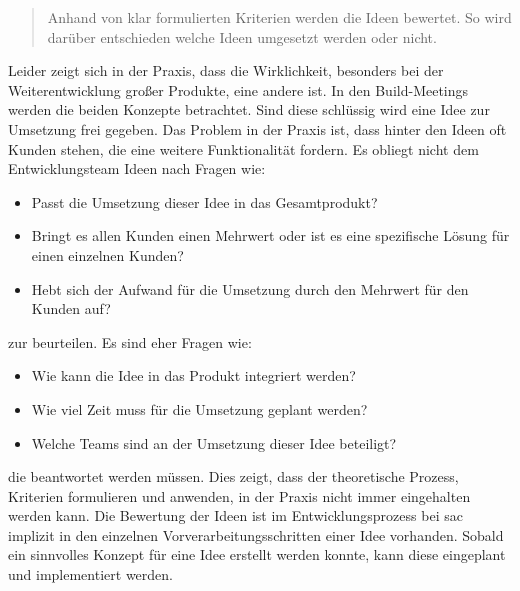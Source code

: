 \begin{quote}Anhand von klar formulierten Kriterien werden die Ideen bewertet. So wird darüber entschieden welche Ideen umgesetzt werden oder nicht.\end{quote}

Leider zeigt sich in der Praxis, dass die Wirklichkeit, besonders bei der Weiterentwicklung großer Produkte, eine andere ist. 
In den Build-Meetings werden die beiden Konzepte betrachtet. Sind diese schlüssig wird eine Idee zur Umsetzung frei gegeben. 
Das Problem in der Praxis ist, dass hinter den Ideen oft Kunden stehen, die eine weitere Funktionalität fordern. Es obliegt nicht 
dem Entwicklungsteam Ideen nach Fragen wie: 
\begin{itemize}
    \item Passt die Umsetzung dieser Idee in das Gesamtprodukt?
    \item Bringt es allen Kunden einen Mehrwert oder ist es eine spezifische Lösung für einen einzelnen Kunden?
    \item Hebt sich der Aufwand für die Umsetzung durch den Mehrwert für den Kunden auf?
\end{itemize}
zur beurteilen. Es sind eher Fragen wie: 
\begin{itemize}
    \item Wie kann die Idee in das Produkt integriert werden?
    \item Wie viel Zeit muss für die Umsetzung geplant werden? 
    \item Welche Teams sind an der Umsetzung dieser Idee beteiligt?
\end{itemize}
die beantwortet werden müssen. 
Dies zeigt, dass der theoretische Prozess, Kriterien formulieren und anwenden, in der Praxis nicht immer eingehalten werden kann.
Die Bewertung der Ideen ist im Entwicklungsprozess bei \ac{sac} implizit in den einzelnen Vorverarbeitungsschritten einer Idee vorhanden.
Sobald ein sinnvolles Konzept für eine Idee erstellt werden konnte, kann diese eingeplant und implementiert werden.